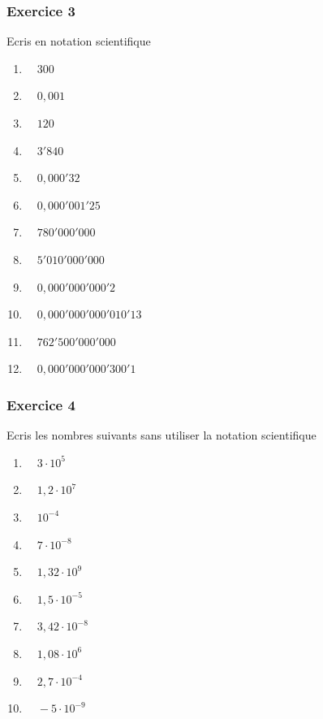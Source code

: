 \documentclass[
  12pt,
]{book}
\providecommand{\tightlist}{%
  \setlength{\itemsep}{0pt}\setlength{\parskip}{0pt}}
\begin{document}
\hypertarget{exercice-3-1}{%
\subsubsection*{Exercice 3}\label{exercice-3-1}}

Ecris en notation scientifique

\begin{enumerate}
\def\labelenumi{\arabic{enumi}.}
\tightlist
\item
  \(\quad 300\)
\item
  \(\quad 0{,}001\)
\item
  \(\quad 120\)
\item
  \(\quad 3'840\)
\item
  \(\quad 0{,}000'32\)
\item
  \(\quad 0{,}000'001'25\)
\item
  \(\quad 780'000'000\)
\item
  \(\quad 5'010'000'000\)
\item
  \(\quad 0{,}000'000'000'2\)
\item
  \(\quad 0{,}000'000'000'010'13\)
\item
  \(\quad 762'500'000'000\)
\item
  \(\quad 0{,}000'000'000'300'1\)
\end{enumerate}

\hypertarget{exercice-4-1}{%
\subsubsection*{Exercice 4}\label{exercice-4-1}}

Ecris les nombres suivants sans utiliser la notation scientifique

\begin{enumerate}
\def\labelenumi{\arabic{enumi}.}
\tightlist
\item
  \(\quad 3\cdot 10^5\)
\item
  \(\quad 1{,}2\cdot 10^7\)
\item
  \(\quad 10^{-4}\)
\item
  \(\quad 7\cdot 10^{-8}\)
\item
  \(\quad 1{,}32\cdot 10^9\)
\item
  \(\quad 1{,}5\cdot 10^{-5}\)
\item
  \(\quad 3{,}42\cdot 10^{-8}\)
\item
  \(\quad 1{,}08\cdot 10^6\)
\item
  \(\quad 2{,}7\cdot 10^{-4}\)
\item
  \(\quad -5\cdot 10^{-9}\)
\end{enumerate}
\end{document}
